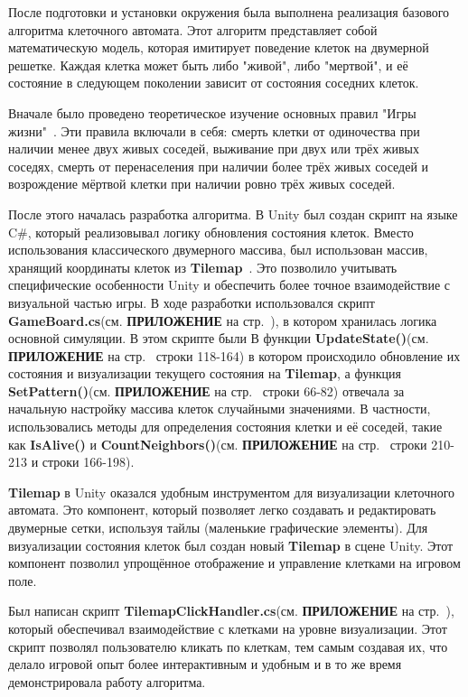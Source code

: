 После подготовки и установки окружения была выполнена реализация базового алгоритма клеточного автомата. Этот алгоритм представляет собой математическую модель, которая имитирует поведение клеток на двумерной решетке. Каждая клетка может быть либо "живой", либо "мертвой", и её состояние в следующем поколении зависит от состояния соседних клеток.

Вначале было проведено теоретическое изучение основных правил "Игры жизни"~\cite{GameLife}. Эти правила включали в себя: смерть клетки от одиночества при наличии менее двух живых соседей, выживание при двух или трёх живых соседях, смерть от перенаселения при наличии более трёх живых соседей и возрождение мёртвой клетки при наличии ровно трёх живых соседей.

После этого началась разработка алгоритма. В Unity был создан скрипт на языке C\#, который реализовывал логику обновления состояния клеток. Вместо использования классического двумерного массива, был использован массив, хранящий координаты клеток из \textbf{Tilemap}~\cite{tilemap}. Это позволило учитывать специфические особенности Unity и обеспечить более точное взаимодействие с визуальной частью игры. В ходе разработки использовался скрипт \textbf{GameBoard.cs}(см. \textbf{\textsc{ПРИЛОЖЕНИЕ}} на стр.~\pageref{code:brgame}), в котором хранилась логика основной симуляции. В этом скрипте были В функции \textbf{UpdateState()}(см. \textbf{\textsc{ПРИЛОЖЕНИЕ}} на стр.~\pageref{code:brgame} строки 118-164) в котором происходило обновление их состояния и визуализации текущего состояния на \textbf{Tilemap}, а функция \textbf{SetPattern()}(см. \textbf{\textsc{ПРИЛОЖЕНИЕ}} на стр.~\pageref{code:brgame} строки 66-82) отвечала за начальную настройку массива клеток случайными значениями.  В частности, использовались методы для определения состояния клетки и её соседей, такие как \textbf{IsAlive()} и \textbf{CountNeighbors()}(см. \textbf{\textsc{ПРИЛОЖЕНИЕ}} на стр.~\pageref{code:brgame} строки 210-213 и строки 166-198).

\textbf{Tilemap} в Unity оказался удобным инструментом для визуализации клеточного автомата. Это компонент, который позволяет легко создавать и редактировать двумерные сетки, используя тайлы (маленькие графические элементы). Для визуализации состояния клеток был создан новый \textbf{Tilemap} в сцене Unity. Этот компонент позволил упрощённое отображение и управление клетками на игровом поле.



Был написан скрипт \textbf{TilemapClickHandler.cs}(см. \textbf{\textsc{ПРИЛОЖЕНИЕ}} на стр.~\pageref{code:click}), который обеспечивал взаимодействие с клетками на уровне визуализации. Этот скрипт позволял пользователю кликать по клеткам, тем самым создавая их, что делало игровой опыт более интерактивным и удобным и в то же время демонстрировала работу алгоритма.

